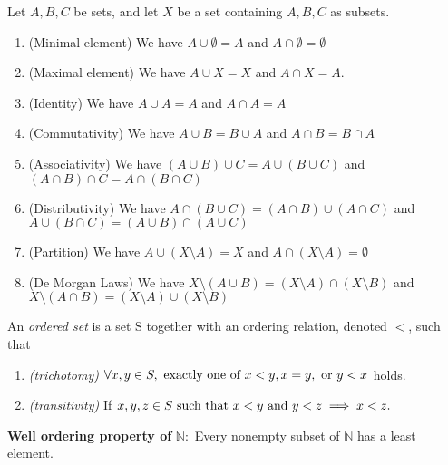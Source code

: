 \documentclass[../main.tex]{subfiles}
\begin{document}
\begin{proposition}\label{prp:set_operations}
Let $A, B, C$ be sets, and let $X$ be a set containing $A, B, C$ as subsets. 
\begin{enumerate}
    \item (Minimal element) We have $ A \cup \emptyset = A$ and $A \cap \emptyset = \emptyset$
    \item (Maximal element) We have $ A \cup X = X$ and $ A \cap X = A$.
    \item (Identity) We have $ A \cup A = A$ and $ A \cap A = A$
    \item (Commutativity) We have $ A \cup B = B \cup A$ and $ A \cap B = B \cap A$
    \item (Associativity) We have $ (A \cup B) \cup C = A \cup (B\cup C)$ and $ (A\cap B) \cap C = A \cap (B \cap C)$
    \item (Distributivity) We have $ A \cap (B\cup C) = (A \cap B) \cup (A\cap C) $ and $ A \cup (B \cap C) = (A \cup B) \cap (A\cup C)$
    \item (Partition) We have $ A \cup (X \setminus A) = X$ and $ A \cap (X \setminus A) = \emptyset$
    \item (De Morgan Laws) We have $ X \setminus (A \cup B) = (X \setminus A) \cap (X \setminus B)$ and $ X \setminus (A \cap B) = (X \setminus A) \cup (X \setminus B)$
\end{enumerate}
\end{proposition}





\begin{definition}\label{def:ordered set}
An \textit{ordered set} is a set S together with an ordering relation, denoted \(<\), such that
\begin{enumerate}
    \item \textit{(trichotomy)} \(\forall x,y \in S, \textnormal{ exactly one of } x < y, x=y, \textnormal{ or } y<x\) holds.
    \item \textit{(transitivity)} If \(x,y,z \in S \textnormal{ such that } x < y \textnormal{ and } y < z \implies x < z.\)
\end{enumerate}
\textbf{Well ordering property of }\label{def:WOA}\(\mathbb{N}:\) Every nonempty subset of \(\mathbb{N}\) has a least element.
\end{definition}
\end{document}
